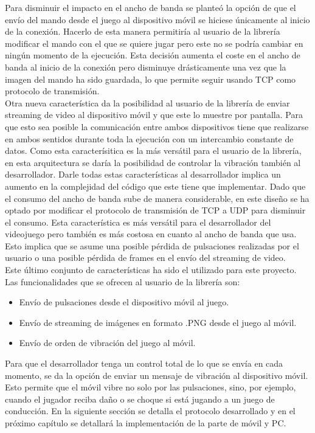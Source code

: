 Para disminuir el impacto en el ancho de banda se plante\'o la opci\'on de que el env\'io del mando desde el juego al dispositivo m\'ovil se hiciese \'unicamente al inicio de la conexi\'on. Hacerlo de esta manera permitir\'ia al usuario de la librer\'ia modificar el mando con el que se quiere jugar pero este no se podr\'ia cambiar en ning\'un momento de la ejecuci\'on. Esta decisi\'on aumenta el coste en el ancho de banda al inicio de la conexi\'on pero disminuye dr\'asticamente una vez que la imagen del mando ha sido guardada, lo que permite seguir usando TCP como protocolo de transmisi\'on.\\


Otra nueva caracter\'istica da la posibilidad al usuario de la librer\'ia de enviar streaming de video al dispositivo m\'ovil y que este lo muestre por pantalla. Para que esto sea posible la comunicaci\'on entre ambos dispositivos tiene que realizarse en ambos sentidos durante toda la ejecuci\'on con un intercambio constante de datos. Como esta caracter\'isitica es la m\'as vers\'atil para el usuario de la librer\'ia, en esta arquitectura se dar\'ia la posibilidad de controlar la vibraci\'on tambi\'en al desarrollador. Darle todas estas caracter\'isticas al desarrollador implica un aumento en la complejidad del c\'odigo que este tiene que implementar. Dado que el consumo del ancho de banda sube de manera considerable, en este dise\~no se ha optado por modificar el protocolo de transmisi\'on de TCP a UDP para disminuir el consumo. Esta caracter\'istica es m\'as vers\'atil para el desarrollador del videojuego pero tambi\'en es m\'as costosa en cuanto al ancho de banda que usa. Esto implica que se asume una posible p\'erdida de pulsaciones realizadas por el usuario o una posible p\'erdida de frames en el env\'io del streaming de video.\\

Este \'ultimo conjunto de caracter\'isticas ha sido el utilizado para este proyecto. Las funcionalidades que se ofrecen al usuario de la librer\'ia son:

\begin {itemize}
\item Env\'io de pulsaciones desde el dispositivo m\'ovil al juego.
\item Env\'io de streaming de im\'agenes en formato .PNG desde el juego al m\'ovil.
\item Env\'io de orden de vibraci\'on del juego al m\'ovil.
\end {itemize}

Para que el desarrollador tenga un control total de lo que se env\'ia en cada momento, se da la opci\'on de enviar un mensaje de vibraci\'on al dispositivo m\'ovil. Esto permite que el m\'ovil vibre no solo por las pulsaciones, sino, por ejemplo, cuando el jugador reciba da\~no o se choque si est\'a jugando a un juego de conducci\'on. En la siguiente secci\'on se detalla el protocolo desarrollado y en el pr\'oximo cap\'itulo se detallar\'a la implementaci\'on de la parte de m\'ovil y PC.


